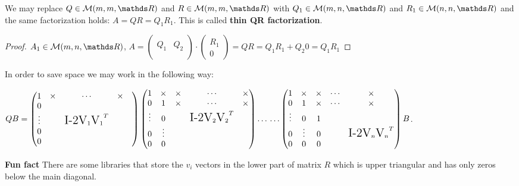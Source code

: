 \documentclass[computational_mathematics.tex]{subfiles}
\begin{document}
\begin{proposition} 
  We may replace $Q \in \mathcal{M}(m, m, \R)$ and $R \in \mathcal{M}(m, m, \R)$ with $Q_1 \in \mathcal{M}(m, n, \R)$ and $R_1 \in \mathcal{M}(n, n, \R)$ and the same factorization holds: $A=QR=Q_1R_1$. This is called \textbf{thin QR factorization}.
\end{proposition}
\begin{proof}
 $A_{1} \in \mathcal{M}(m, n, \R)$, $ A =\begin{pmatrix}
    &\\
    Q_{1} & Q_{2}\\
    &\\
  \end{pmatrix}
  \cdot
  \begin{pmatrix}
    R_{1}\\
    0
  \end{pmatrix}
  =
  Q R
  =
    Q_{1} R_{1}
  +
    Q_{2} 0
  =
  Q_{1} R_{1}$
\end{proof}
In order to save space we may work in the following way:

$Q B =
  \begin{pmatrix}
    1 & \times &\cdots & \times\\
    0 &&&&\\
    \vdots &&\text{\Large I-2V}_1 {\text{\Large V}_1}^{T}&\\
    0 &&&&\\
    0 &&&&
  \end{pmatrix} 
  \begin{pmatrix}
    1 & \times & \times & \cdots & \times\\
    0 & 1 &\times & \cdots& \times\\
    \vdots & 0 &&\text{\Large I-2V}_2 {\text{\Large V}_2}^{T}\\
    0 & \vdots &&&\\
    0 & 0 &&
  \end{pmatrix} \ldots \\ \ldots
  \begin{pmatrix}
    1 & \times & \times & \cdots & \times\\
    0 & 1 & \times & \cdots & \times\\
    \vdots & 0 & 1 &\\
    0 & \vdots & 0 &&\text{\Large I-2V}_n {\text{\Large V}_n}^{T}\\
    0 & 0 & 0 &
  \end{pmatrix} B$.

\begin{myframe}{\bf Fun fact}
There are some libraries that store the $v_{i}$ vectors in the lower part of matrix $R$ which is upper triangular and has only zeros below the main diagonal.
\end{myframe}
\end{document}
